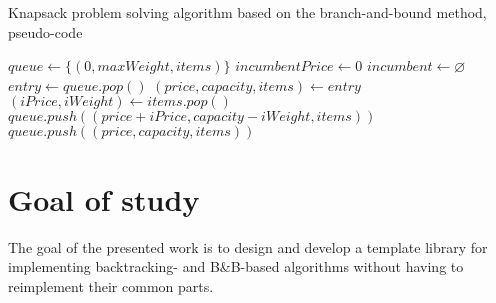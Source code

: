 \begin{algorithm}
\caption{Knapsack problem solving algorithm based on the branch-and-bound method, pseudo-code}
\label{alg:knapsack}
\begin{algorithmic}
    \State $queue \gets \{(0, maxWeight, items)\}$
    \State $incumbentPrice \gets 0$
    \State $incumbent \gets \varnothing$
        \State $entry \gets queue.pop()$
            \State $(price, capacity, items) \gets entry$
            \State $(iPrice, iWeight) \gets items.pop()$
                \State $queue.push((price + iPrice, capacity - iWeight, items))$
            \EndIf
            \State $queue.push((price, capacity, items))$
        \EndIf
    \EndWhile
    \State {}
\EndProcedure
\end{algorithmic}
\end{algorithm}

\section{Goal of study}

The goal of the presented work is to design and develop a template library for implementing
backtracking- and B\&B-based algorithms without having to reimplement their common parts.




